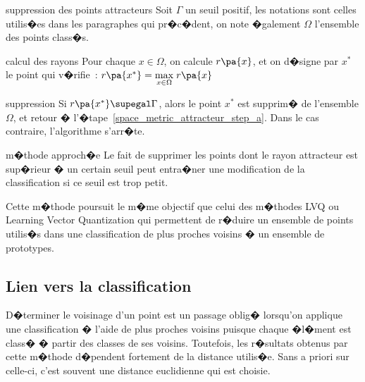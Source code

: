             \begin{xalgorithm}{suppression des points attracteurs}
            Soit $\Gamma$ un seuil positif, les notations sont celles utilis�es dans les paragraphes qui pr�c�dent, 
            on note �galement $\Omega$ l'ensemble des points class�s.
            
            \begin{xalgostep}{calcul des rayons}\label{space_metric_attracteur_step_a}
            Pour chaque $x \in \Omega$, on calcule $r\pa{x}$, et on d�signe par $x^*$ le point qui v�rifie~:
            $r\pa{x^*} = \underset{x \in \Omega} {\max} \; { r\pa{x} }$
            \end{xalgostep}
            
            \begin{xalgostep}{suppression}
            Si $r\pa{x^*} \supegal \Gamma$, alors le point $x^*$ est supprim� de l'ensemble $\Omega$, et retour 
            � l'�tape~\ref{space_metric_attracteur_step_a}. Dans le cas contraire, l'algorithme s'arr�te.
            \end{xalgostep}
            
            \end{xalgorithm}
            


\begin{xremark}{m�thode approch�e}
Le fait de supprimer les points dont le rayon attracteur est sup�rieur � un certain seuil peut entra�ner une modification de la classification si ce seuil est trop petit.
\end{xremark}

Cette m�thode poursuit le m�me objectif que celui des m�thodes LVQ ou Learning Vector Quantization qui permettent de r�duire un ensemble de points utilis�s dans une classification de plus proches voisins � un ensemble de prototypes.



    
\subsection{Lien vers la classification}


D�terminer le voisinage d'un point est un passage oblig� lorsqu'on applique une classification � l'aide de plus proches voisins puisque chaque �l�ment est class� � partir des classes de ses voisins. Toutefois, les r�sultats obtenus par cette m�thode d�pendent fortement de la distance utilis�e. Sans a priori sur celle-ci, c'est souvent une distance euclidienne qui est choisie. 

